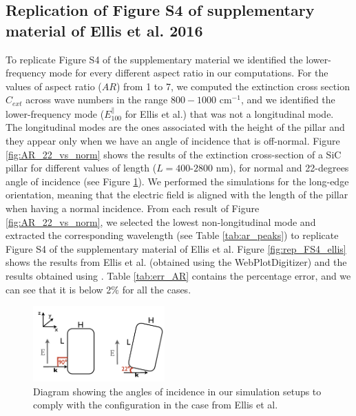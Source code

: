 \subsection{Replication of Figure S4 of supplementary material of Ellis et al. 2016}

To replicate Figure S4 of the supplementary material we identified the lower-frequency mode for every different 
aspect ratio in our computations. For the values of aspect ratio ($AR$) from 1 to 7, we computed the extinction cross section 
$C_{ext}$ across wave numbers in the range $800-1000$ cm$^{-1}$, and we identified the lower-frequency mode 
($E^{\parallel}_{100}$ for Ellis et al.) that was not a longitudinal mode. The longitudinal modes are the ones associated with 
the height of the pillar and they appear only when we have an angle of incidence that is off-normal. 
Figure \ref{fig:AR_22_vs_norm} shows the results of the extinction cross-section of a SiC pillar for different values of 
length ($L=400$-$2800$ nm), for normal and 22-degrees angle of incidence (see Figure \ref{fig:ellis_ang_inc}). We performed 
the simulations for the long-edge orientation, meaning that the electric field is aligned with the length of the pillar when having a normal 
incidence. From each result of Figure \ref{fig:AR_22_vs_norm}, we selected the lowest non-longitudinal mode and extracted the corresponding wavelength
(see Table \ref{tab:ar_peaks}) to replicate Figure S4 of the supplementary material of Ellis et al. Figure \ref{fig:rep_FS4_ellis} shows the
results from Ellis et al. (obtained using the WebPlotDigitizer) and the results obtained using \pygbe. Table \ref{tab:err_AR} contains the 
percentage error, and we can see that it is below 2$\%$ for all the cases.

\begin{figure}
    \centering
    \includegraphics[width=0.45\textwidth]{ellis_ang_inc.pdf} 
    \caption{Diagram showing the angles of incidence in our simulation setups to comply with the configuration in the case from Ellis et al.}
    \label{fig:ellis_ang_inc}
\end{figure}

